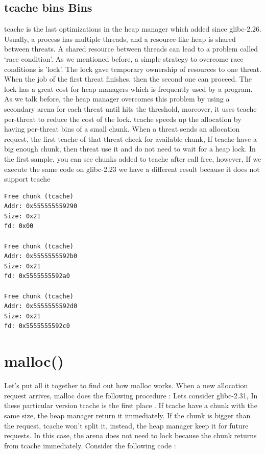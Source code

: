 \documentclass{masterthesis}
\newcommand*\libc{glibc}
\newcommand*\tch{tcache}
\begin{document}
\subsection{\tch{} bins Bins}
\tch{} is the last optimizations in the heap manager which added since \libc{-2.26}. Usually, a process has multiple threads, and a resource-like heap is shared between threats. A shared resource between threads can lead to a problem called ‘race condition’. As we mentioned before, a simple strategy to overcome race conditions is 'lock'. The lock gave temporary ownership of resources to one threat. When the job of the first threat finishes, then the second one can proceed. The lock has a great cost for heap managers which is frequently used by a program. As we talk before, the heap manager overcomes this problem by using a secondary arena for each threat until hits the threshold, moreover, it uses \tch{} per-threat to reduce the cost of the lock. \tch{} speeds up the allocation by having per-threat bins of a small chunk. When a threat sends an allocation request, the first \tch{} of that threat check for available chunk, If \tch{} have a big enough chunk, then threat use it and do not need to wait for a heap lock. In the first sample, you can see chunks added to \tch{} after call free, however, If we execute the same code on \libc{-2.23} we have a different result because it does not support \tch{}

\begin{lstlisting}[frame=tlrb]
Free chunk (tcache) 
Addr: 0x555555559290
Size: 0x21
fd: 0x00

Free chunk (tcache) 
Addr: 0x5555555592b0
Size: 0x21
fd: 0x5555555592a0

Free chunk (tcache) 
Addr: 0x5555555592d0
Size: 0x21
fd: 0x5555555592c0
\end{lstlisting}

\section{malloc()}
Let's put all it together to find out how malloc works. When a new allocation request arrives, malloc does the following procedure :
Lets consider \libc{-2.31}, In these particular version \tch{} is the first place . If \tch{} have a chunk with the same size, the heap manager return it immediately. If the chunk is bigger than the request, \tch{} won't split it, instead, the heap manager keep it for future requests. In this case, the arena does not need to lock because the chunk returns from \tch{} immediately. Consider the following code :
\end{document}
